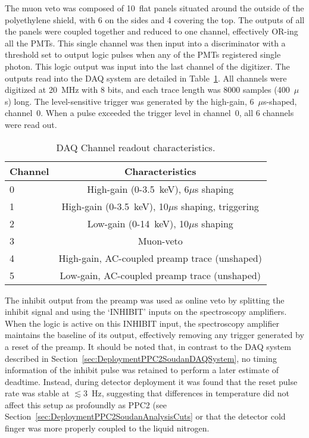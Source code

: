 The muon veto was composed of 10~flat panels situated around the outside of the polyethylene shield, with 6 on the sides and 4 covering the top.  The outputs of all the panels were coupled together and reduced to one channel, effectively OR-ing all the PMTs.  This single channel was then input into a discriminator with a threshold set to output logic pulses when any of the PMTs registered single photon.  This logic output was input into the last channel of the digitizer.  The outputs read into the DAQ system are detailed in Table~\ref{tab:SoudanDAQTable}.  All channels were digitized at 20~MHz with 8 bits, and each trace length was 8000 samples (400~$\mu$s) long.  The level-sensitive trigger was generated by the high-gain, 6~$\mu$s-shaped, channel~0.  When a pulse exceeded the trigger level in channel~0, all 6 channels were read out.  

\begin{table}
	\centering
	\begin{tabular}{|l|c|}
		\hline
		Channel & Characteristics \\
		\hline
		\hline
		0 & High-gain (0-3.5~keV), 6$\mu$s shaping \\
		\hline
		1 & High-gain (0-3.5~keV), 10$\mu$s shaping, triggering \\
		\hline
		2 & Low-gain (0-14~keV), 10$\mu$s shaping \\
		\hline
		3 & Muon-veto \\
		\hline
		4 & High-gain, AC-coupled preamp trace (unshaped) \\
		\hline
		5 & Low-gain, AC-coupled preamp trace (unshaped) \\
		\hline
	\end{tabular}
	\caption[DAQ Channel readout characteristics]
	{DAQ Channel readout characteristics. }
	\label{tab:SoudanDAQTable}
\end{table}

The inhibit output from the preamp was used as online veto by splitting the inhibit signal and using the `INHIBIT' inputs on the spectroscopy amplifiers.  When the logic is active on this INHIBIT input, the spectroscopy amplifier maintains the baseline of its output, effectively removing any trigger generated by a reset of the preamp.  It should be noted that, in contrast to the DAQ system described in Section~\ref{sec:DeploymentPPC2SoudanDAQSystem}, no timing information of the inhibit pulse was retained to perform a later estimate of deadtime.  Instead, during detector deployment it was found that the reset pulse rate was stable at $\lesssim$3~Hz, suggesting that differences in temperature did not affect this setup as profoundly as PPC2 (see Section~\ref{sec:DeploymentPPC2SoudanAnalysisCuts} or that the detector cold finger was more properly coupled to the liquid nitrogen.  %

